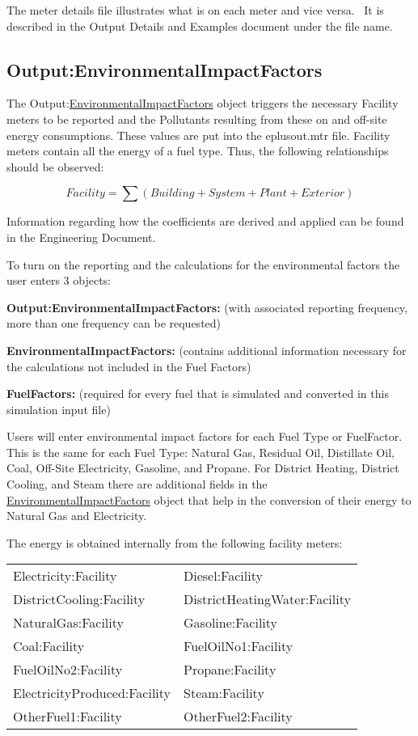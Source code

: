 The meter details file illustrates what is on each meter and vice versa.~ It is described in the Output Details and Examples document under the file name.

\subsection{Output:EnvironmentalImpactFactors}\label{outputenvironmentalimpactfactors}

The Output:\hyperref[environmentalimpactfactors]{EnvironmentalImpactFactors} object triggers the necessary Facility meters to be reported and the Pollutants resulting from these on and off-site energy consumptions. These values are put into the eplusout.mtr file. Facility meters contain all the energy of a fuel type. Thus, the following relationships should be observed:

\begin{equation}
Facility = \sum {\left( {Building + System + Plant + Exterior} \right)}
\end{equation}

Information regarding how the coefficients are derived and applied can be found in the Engineering Document.

To turn on the reporting and the calculations for the environmental factors the user enters 3 objects:

\textbf{Output:EnvironmentalImpactFactors:} (with associated reporting frequency, more than one frequency can be requested)

\textbf{EnvironmentalImpactFactors:} (contains additional information necessary for the calculations not included in the Fuel Factors)

\textbf{FuelFactors:} (required for every fuel that is simulated and converted in this simulation input file)

Users will enter environmental impact factors for each Fuel Type or FuelFactor. This is the same for each Fuel Type: Natural Gas, Residual Oil, Distillate Oil, Coal, Off-Site Electricity, Gasoline, and Propane. For District Heating, District Cooling, and Steam there are additional fields in the \hyperref[environmentalimpactfactors]{EnvironmentalImpactFactors} object that help in the conversion of their energy to Natural Gas and Electricity.

The energy is obtained internally from the following facility meters:

\begin{longtable}[c]{@{}ll@{}}
\toprule
%
%
Electricity:Facility & Diesel:Facility \tabularnewline
DistrictCooling:Facility & DistrictHeatingWater:Facility \tabularnewline
NaturalGas:Facility & Gasoline:Facility \tabularnewline
Coal:Facility & FuelOilNo1:Facility \tabularnewline
FuelOilNo2:Facility & Propane:Facility \tabularnewline
ElectricityProduced:Facility & Steam:Facility \tabularnewline
OtherFuel1:Facility & OtherFuel2:Facility \tabularnewline
\bottomrule
\end{longtable}

